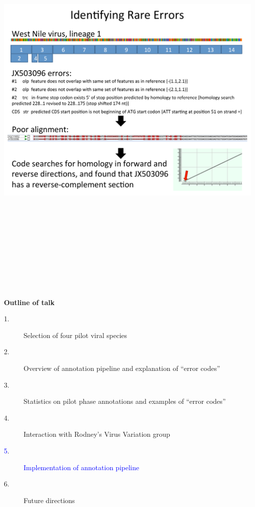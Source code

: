\documentclass[landscape]{slides}
\begin{document}
\begin{slide}
\begin{center}
\includegraphics[height=8in]{figs/eneida-slide-4}
\vfill
\end{center}
\end{slide}
\begin{slide}
\begin{center}
\textbf{Outline of talk}

\small
\begin{description}
\item[1.] Selection of four pilot viral species
\item[2.] Overview of annotation pipeline and explanation of ``error codes''
\item[3.] Statistics on pilot phase annotations and examples of ``error codes''
\item[4.] Interaction with Rodney's Virus Variation group
\item[\textcolor{blue}5.] \textcolor{blue}{Implementation of annotation pipeline}
\item[6.] Future directions
\end{description}

\end{center}
\vfill
\end{slide}
\end{document}
